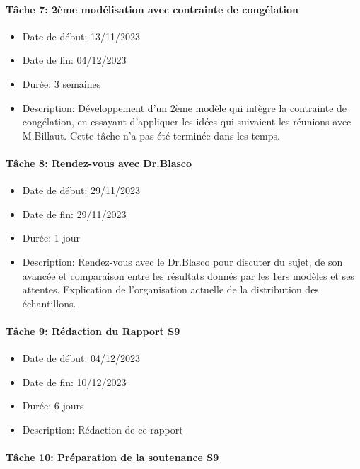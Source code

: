 \documentclass{polytech/polytech}
\numberwithin{figure}{chapter}
\begin{document}
\begin{appendix}
\paragraph{Tâche 7: 2ème modélisation avec contrainte de congélation}

\begin{itemize}
    \item Date de début: 13/11/2023
    \item Date de fin: 04/12/2023
    \item Durée: 3 semaines
    \item
        Description: Développement d'un 2ème modèle qui intègre la contrainte de congélation, en essayant d'appliquer les idées qui suivaient les réunions avec M.Billaut. Cette tâche n'a pas été terminée dans les temps.
\end{itemize}

\paragraph{Tâche 8: Rendez-vous avec Dr.Blasco}

\begin{itemize}
    \item Date de début: 29/11/2023
    \item Date de fin: 29/11/2023
    \item Durée: 1 jour
    \item
        Description: Rendez-vous avec le Dr.Blasco pour discuter du sujet, de son avancée et comparaison entre les résultats donnés par les 1ers modèles et ses attentes. Explication de l'organisation actuelle de la distribution des échantillons.  
\end{itemize}

\paragraph{Tâche 9: Rédaction du Rapport S9}

\begin{itemize}
    \item Date de début: 04/12/2023
    \item Date de fin: 10/12/2023
    \item Durée: 6 jours
    \item
        Description: Rédaction de ce rapport
\end{itemize}

\paragraph{Tâche 10: Préparation de la soutenance S9}


\end{appendix}
\end{document}
